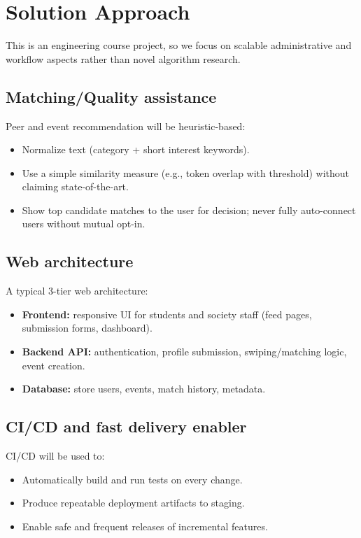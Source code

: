 \documentclass[12pt, a4paper]{article}
\begin{document}
\section{Solution Approach} 
This is an engineering course project, so we focus on scalable administrative and workflow aspects rather than novel algorithm research.

\subsection{Matching/Quality assistance} 
Peer and event recommendation will be heuristic-based:
\begin{itemize}
    \item Normalize text (category + short interest keywords).
    \item Use a simple similarity measure (e.g., token overlap with threshold) without claiming state-of-the-art.
    \item Show top candidate matches to the user for decision; never fully auto-connect users without mutual opt-in.
\end{itemize}

\subsection{Web architecture} 
A typical 3-tier web architecture:
\begin{itemize}
    \item \textbf{Frontend:} responsive UI for students and society staff (feed pages, submission forms, dashboard).
    \item \textbf{Backend API:} authentication, profile submission, swiping/matching logic, event creation.
    \item \textbf{Database:} store users, events, match history, metadata.
\end{itemize}

\subsection{CI/CD and fast delivery enabler} 
CI/CD will be used to:
\begin{itemize}
    \item Automatically build and run tests on every change.
    \item Produce repeatable deployment artifacts to staging.
    \item Enable safe and frequent releases of incremental features.
\end{itemize}
\end{document}
